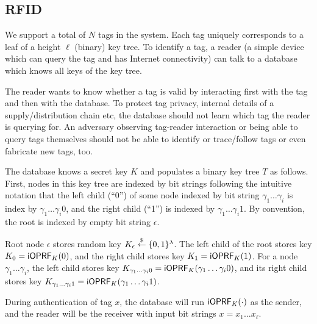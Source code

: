 \subsection{RFID}
We support a total of $N$ tags in the system. Each tag uniquely
corresponds to a leaf of a height $\ell$ (binary) key tree. To
identify a tag, a reader (a simple device which can query the tag and
has Internet connectivity) can talk to a database which knows all keys
of the key tree.

The reader wants to know whether a tag is valid by interacting first
with the tag and then with the database. To protect tag privacy,
internal details of a supply/distribution chain etc, the database
should not learn which tag the reader is querying for. An adversary
observing tag-reader interaction or being able to query tags
themselves should not be able to identify or trace/follow tags or
even fabricate new tags, too.


The database knows a secret key $K$ and populates a binary key tree
$T$ as follows. First, nodes in this key tree are indexed by bit
strings following the intuitive notation that the left child (``0'')
of some node indexed by bit string $\gamma_1\ldots\gamma_i$ is index by
$\gamma_1\ldots\gamma_i0$, and the right child (``1'') is indexed by
$\gamma_1\ldots\gamma_i1$. By convention, the root is indexed by
empty bit string $\epsilon$.

Root node $\epsilon$ stores random key
$K_{\epsilon}\stackrel{\$}{\leftarrow}\{0,1\}^\lambda$.  The left child of the root stores
key $K_0=\mathsf{i}\mathsf{OPRF}_K(0)$, and the right child stores key
$K_1=\mathsf{i}\mathsf{OPRF}_K(1)$. For a node $\gamma_1\ldots\gamma_i$,
the left child stores key
$K_{\gamma_1\ldots\gamma_i0}=\mathsf{i}\mathsf{OPRF}_K(\gamma_1\ldots\gamma_i0)$, and its
right child stores key
$K_{\gamma_1\ldots\gamma_i1}=\mathsf{i}\mathsf{OPRF}_K(\gamma_1\ldots\gamma_i1)$.

During authentication of tag $x$, the database will run
$\mathsf{i}\mathsf{OPRF}_K(\cdot)$ as the sender, and the reader will be the receiver
with input bit strings $x=x_1\ldots{}x_\ell$.

